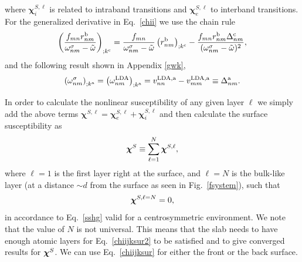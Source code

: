\documentclass[floatfix,prb,aps,superscriptaddress,11pt,preprint,letterpaper]{revtex4}
\begin{document}
where $\boldsymbol{\chi}^{S,\ell}_i$
 is related to intraband transitions and
$\boldsymbol{\chi}^{S,\ell}_e$
to interband transitions.
For the generalized derivative in Eq.~\eqref{chii} we use the chain rule 
\begin{equation}\label{gene2}
\left(\frac{f_{mn}r_{nm}^{\mathrm{b}}}{\omega^\sigma_{nm}-\tilde\omega}\right)_{;k^{\mathrm{c}}}=
\frac{f_{mn}}{\omega^\sigma_{nm}-\tilde\omega}\left(r_{nm}^{\mathrm{b}}\right)_{;k^{\mathrm{c}}}
-\frac{f_{mn}r_{nm}^{\mathrm{b}}\Delta_{nm}^{\mathrm{c}}}{(\omega^\sigma_{nm}-\tilde\omega)^2}
,
\end{equation}
and the following result
shown in Appendix \ref{gwk},
\begin{align}\label{eli.13}
\left(\omega^\sigma_{nm}\right)_{;k^{\mathrm{a}}}
=
\left(\omega^{\mathrm{LDA}}_{nm}\right)_{;k^{\mathrm{a}}}
= 
v_{nn}^{\mathrm{LDA},\mathrm{a}}-v_{mm}^{\mathrm{LDA},\mathrm{a}}\equiv\Delta_{nm}^{\mathrm{a}}
.
\end{align} 

In order to calculate the nonlinear susceptibility of any given layer 
$\ell$ we simply add the above terms $\boldsymbol{\chi}^{S,\ell}=
\boldsymbol{\chi}_e^{S,\ell}+\boldsymbol{\chi}_i^{S,\ell}$ and 
then calculate the surface susceptibility as 
\begin{equation}\label{chiijksur}
\boldsymbol{\chi}^S\equiv \sum_{\ell=1}^{N}\boldsymbol{\chi}^{S,\ell},
\end{equation} 
where $\ell=1$ is the first layer right at the surface, 
and $\ell=N$ is the bulk-like layer (at a distance $\sim d$ from the
surface  as seen in
Fig.~\ref{fsystem}), such that 
\begin{equation}\label{chiijksur2}
\boldsymbol{\chi}^{S,\ell=N}=0,
\end{equation}
in accordance to Eq.~\eqref{sshg} valid for a centrosymmetric environment. 
We note that the value of
$N$ is not universal.
This means that the slab needs to have enough atomic layers for 
Eq.~\eqref{chiijksur2} 
to be satisfied and to give converged results for $\boldsymbol{\chi}^S$. 
We can use Eq.~\eqref{chiijksur} for
either the front or the back surface.
\end{document}
